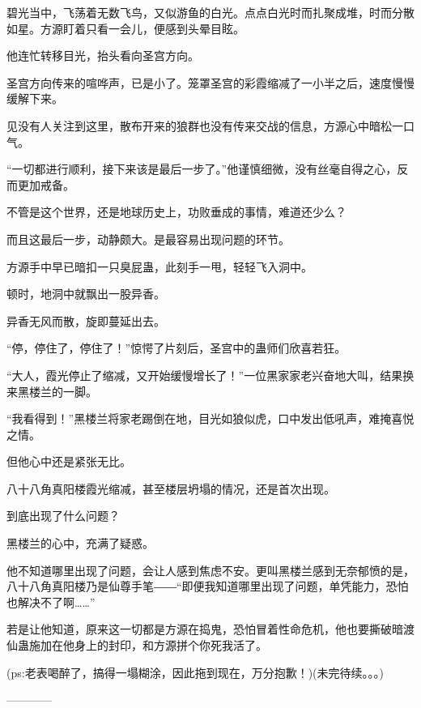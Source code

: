 \begin{this_body}
碧光当中，飞荡着无数飞鸟，又似游鱼的白光。点点白光时而扎聚成堆，时而分散如星。方源盯着只看一会儿，便感到头晕目眩。

他连忙转移目光，抬头看向圣宫方向。

圣宫方向传来的喧哗声，已是小了。笼罩圣宫的彩霞缩减了一小半之后，速度慢慢缓解下来。

见没有人关注到这里，散布开来的狼群也没有传来交战的信息，方源心中暗松一口气。

“一切都进行顺利，接下来该是最后一步了。”他谨慎细微，没有丝毫自得之心，反而更加戒备。

不管是这个世界，还是地球历史上，功败垂成的事情，难道还少么？

而且这最后一步，动静颇大。是最容易出现问题的环节。

方源手中早已暗扣一只臭屁蛊，此刻手一甩，轻轻飞入洞中。

顿时，地洞中就飘出一股异香。

异香无风而散，旋即蔓延出去。

“停，停住了，停住了！”惊愕了片刻后，圣宫中的蛊师们欣喜若狂。

“大人，霞光停止了缩减，又开始缓慢增长了！”一位黑家家老兴奋地大叫，结果换来黑楼兰的一脚。

“我看得到！”黑楼兰将家老踢倒在地，目光如狼似虎，口中发出低吼声，难掩喜悦之情。

但他心中还是紧张无比。

八十八角真阳楼霞光缩减，甚至楼层坍塌的情况，还是首次出现。

到底出现了什么问题？

黑楼兰的心中，充满了疑惑。

他不知道哪里出现了问题，会让人感到焦虑不安。更叫黑楼兰感到无奈郁愤的是，八十八角真阳楼乃是仙尊手笔――“即便我知道哪里出现了问题，单凭能力，恐怕也解决不了啊……”

若是让他知道，原来这一切都是方源在捣鬼，恐怕冒着性命危机，他也要撕破暗渡仙蛊施加在他身上的封印，和方源拼个你死我活了。

(ps:老表喝醉了，搞得一塌糊涂，因此拖到现在，万分抱歉！)(未完待续。。。)

------------

\end{this_body}

